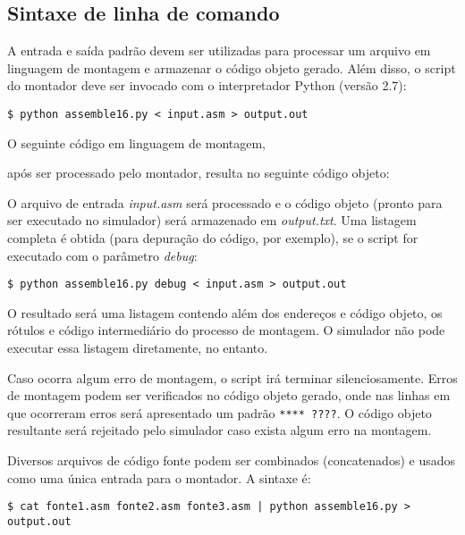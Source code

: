 \documentclass{extreport}
\begin{document}
\subsection{Sintaxe de linha de comando}

A entrada e saída padrão devem ser utilizadas para processar um arquivo em linguagem de montagem e armazenar o código objeto gerado. Além disso, o script do montador deve ser invocado com o interpretador Python (versão 2.7):

\begin{verbatim}
$ python assemble16.py < input.asm > output.out
\end{verbatim}

O seguinte código em linguagem de montagem,



após ser processado pelo montador, resulta no seguinte código objeto:



O arquivo de entrada \textit{input.asm} será processado e o código objeto (pronto para ser executado no simulador) será armazenado em \textit{output.txt}. Uma listagem completa é obtida (para depuração do código, por exemplo), se o script for executado com o parâmetro \textit{debug}:

\begin{verbatim}
$ python assemble16.py debug < input.asm > output.out
\end{verbatim}

O resultado será uma listagem contendo além dos endereços e código objeto, os rótulos e código intermediário do processo de montagem. O simulador não pode executar essa listagem diretamente, no entanto.



Caso ocorra algum erro de montagem, o script irá terminar silenciosamente. Erros de montagem podem ser verificados no código objeto gerado, onde nas linhas em que ocorreram erros será apresentado um padrão \texttt{**** ????}. O código objeto resultante será rejeitado pelo simulador caso exista algum erro na montagem.

Diversos arquivos de código fonte podem ser combinados (concatenados) e usados como uma única entrada para o montador. A sintaxe é:

\begin{verbatim}
$ cat fonte1.asm fonte2.asm fonte3.asm | python assemble16.py > output.out
\end{verbatim}
\end{document}
